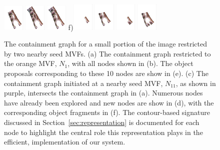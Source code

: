 \begin{figure}[p]
\includegraphics[width=0.09\textwidth]{figs/n8_mvf.png}
\includegraphics[width=0.09\textwidth]{figs/n9_mvf.png}
\includegraphics[width=0.09\textwidth]{figs/n10_mvf.png}
f)\includegraphics[width=0.09\textwidth]{figs/n1_mvf2.png}
\includegraphics[width=0.09\textwidth]{figs/n12_mvf2.png}
\includegraphics[width=0.09\textwidth]{figs/n13_mvf2.png}
\includegraphics[width=0.09\textwidth]{figs/n14_mvf2.png}


\caption{The containment graph for a small portion of the image restricted by two nearby seed MVFs. (a) The containment graph restricted to the orange MVF, $N_1$, with all nodes shown in (b). The object proposals corresponding to these 10 nodes are show in (e). (c) The containment graph initiated at a nearby seed MVF, $N_{11}$, as shown in purple, intersects the containment graph in (a). Numerous nodes have already been explored and new nodes are show in (d), with the corresponding object fragments in (f). The contour-based signature discussed in Section~\ref{sec:representation} is documented for each node to highlight the central role this representation plays in the efficient, implementation of our system. }



\end{figure}
